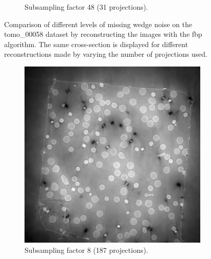 \begin{figure}
\begin{subfigure}[t]{.45\textwidth}
    \caption{Subsampling factor 48 (31 projections). }
  \end{subfigure}
  \caption[Four different levels of missing wedge noise]{Comparison of different levels of missing wedge noise on the tomo\_00058 dataset by reconstructing the images with the \gls{fbp} algorithm. The same cross-section is displayed for different reconstructions made by varying the number of projections used.  }
  \label{fig:tomo00058missingwedgecomparison}
\end{figure}


\begin{figure}
  \begin{subfigure}[t]{.45\textwidth}
    \centering
    \includegraphics[width=\linewidth]{figures/ns8it100000itd4mse035logcosh3.png}
    \caption{Subsampling factor 8 (187 projections). }
  \end{subfigure}
  \hfill
  \begin{subfigure}[t]{.45\textwidth}
    \centering

\end{subfigure}
\end{figure}
